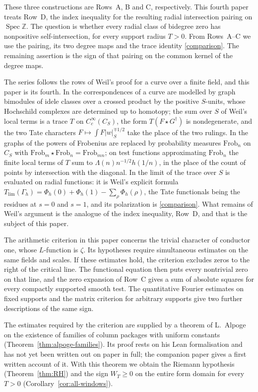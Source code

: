 \documentclass[10pt]{amsart}
\theoremstyle{definition}
\theoremstyle{remark}
\begin{document}
These three constructions are Rows~A, B and C, respectively.
This fourth paper treats Row~D, the index inequality for the resulting
radial intersection pairing on $\operatorname{Spec}\mathbb Z$.
The question is whether every radial class of bidegree zero has nonpositive
self-intersection, for every support radius $T>0$. From Rows~A--C
we use the pairing, its two degree maps and the trace identity
\eqref{comparison}. The remaining assertion is the sign of that
pairing on the common kernel of the degree maps.

The series follows the rows of Weil's proof for a curve over a finite
field, and this paper is its fourth. In \cite{P43} the correspondences
of a curve are modelled by graph bimodules of idele classes over a crossed
product by the positive $S$-units, whose Hochschild complexes are determined
up to homotopy; the sum over $S$ of Weil's local terms is a trace $T$ on
$C_c^\infty(C_S)$, the form $T(F\star G^\dagger)$ is nondegenerate, and the
two Tate characters $F\mapsto\int F|w|_S^{\mp1/2}$ take the place of the two
rulings. In \cite{P44} the graphs of the powers of Frobenius are replaced by
probability measures $\mathrm{Frob}_n$ on $C_S$ with
$\mathrm{Frob}_m\star\mathrm{Frob}_n=\mathrm{Frob}_{mn}$; on test functions
approximating $\mathrm{Frob}_n$ the finite local terms of $T$ sum to
$\Lambda(n)n^{-1/2}h(1/n)$, in the place of the count of points by
intersection with the diagonal. In \cite{Paper45} the limit of the trace
over $S$ is evaluated on radial functions: it is Weil's explicit formula
$T_{\lim}(\Gamma_h)=\Phi_h(0)+\Phi_h(1)-\sum_\rho\Phi_h(\rho)$, the Tate
functionals being the residues at $s=0$ and $s=1$, and its polarization is
\eqref{comparison}. What remains of Weil's argument is the analogue of the
index inequality, Row~D, and that is the subject of this paper.

The arithmetic criterion in this paper concerns the trivial character
of conductor one, whose $L$-function is $\zeta$. Its hypotheses
require simultaneous estimates on the same fields and scales.
If these estimates hold, the criterion excludes zeros to the right
of the critical line. The functional equation then puts every
nontrivial zero on that line, and the zero expansion of Row~C gives
a sum of absolute squares for every compactly supported smooth test.
The quantitative Fourier estimates on
fixed supports and the matrix criterion for arbitrary supports give
two further descriptions of the same sign.

The estimates required by the criterion are supplied by a theorem of
L.~Alpoge on the existence of families of column packages with uniform
constants (Theorem~\ref{thm:alpoge-families}). Its proof rests on his Lean
formalisation \cite{CharacterFamily} and has not yet been written out on
paper in full; the companion paper \cite{Annex} gives a first written
account of it. With this theorem we obtain the Riemann hypothesis
(Theorem~\ref{thm:RH}) and the sign $W_T\ge0$ on the entire form domain for
every $T>0$ (Corollary~\ref{cor:all-windows}).
\end{document}
